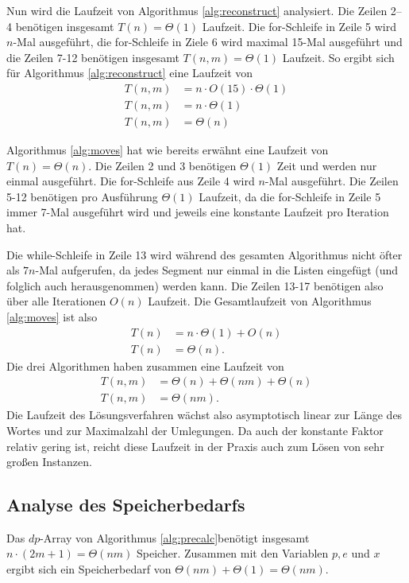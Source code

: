 \documentclass[a4paper,10pt,ngerman]{scrartcl}
\begin{document}
Nun wird die Laufzeit von Algorithmus \ref{alg:reconstruct} analysiert.
Die Zeilen 2--4 benötigen insgesamt $T(n) = \Theta(1)$ Laufzeit. 
Die for-Schleife in Zeile 5 wird $n$-Mal ausgeführt, die for-Schleife in Ziele 6 wird maximal 15-Mal ausgeführt und die Zeilen 7-12 benötigen insgesamt $T(n,m) = \Theta(1)$ Laufzeit. 
So ergibt sich für Algorithmus \ref{alg:reconstruct} eine Laufzeit von 
\begin{align*}
    T(n,m) &= n \cdot O(15) \cdot \Theta(1)\\
    T(n, m) &= n \cdot \Theta(1)\\
    T(n, m) &= \Theta(n)
\end{align*}

Algorithmus \ref{alg:moves} hat wie bereits erwähnt eine Laufzeit von $T(n) = \Theta(n)$. Die Zeilen 2 und 3 benötigen $\Theta(1)$ Zeit und werden nur einmal ausgeführt. 
Die for-Schleife aus Zeile 4 wird $n$-Mal ausgeführt. 
Die Zeilen 5-12 benötigen pro Ausführung $\Theta(1)$ Laufzeit, da die for-Schleife in Zeile 5 immer 7-Mal ausgeführt wird und jeweils eine konstante Laufzeit pro Iteration hat. 

Die while-Schleife in Zeile 13 wird während des gesamten Algorithmus nicht öfter als $7n$-Mal aufgerufen, da jedes Segment nur einmal in die Listen eingefügt (und folglich auch herausgenommen) werden kann. Die Zeilen 13-17 benötigen also über alle Iterationen $O(n)$ Laufzeit.
Die Gesamtlaufzeit von Algorithmus \ref{alg:moves} ist also 
\begin{align*}
    T(n) &= n \cdot \Theta(1) + O(n)\\
    T(n) &= \Theta(n).
\end{align*}
Die drei Algorithmen haben zusammen eine Laufzeit von 
\begin{align*}
    T(n, m) &= \Theta(n) + \Theta(nm) + \Theta(n)\\
    T(n, m) &= \Theta(nm).
\end{align*}
Die Laufzeit des Lösungsverfahren wächst also asymptotisch linear zur Länge des Wortes und zur Maximalzahl der Umlegungen. 
Da auch der konstante Faktor relativ gering ist, reicht diese Laufzeit in der Praxis auch zum Lösen von sehr großen Instanzen.

\subsection{Analyse des Speicherbedarfs}
Das $dp$-Array von Algorithmus \ref{alg:precalc}benötigt insgesamt $n \cdot (2m + 1) = \Theta(nm)$ Speicher. Zusammen mit den Variablen $p, e$ und $x$ ergibt sich ein Speicherbedarf von $\Theta(nm) + \Theta(1) = \Theta(nm)$.
\end{document}

